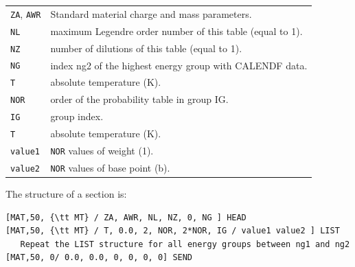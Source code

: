 \begin{tabular}{l l}
{\tt ZA}, {\tt AWR} & Standard material charge and mass parameters. \\
{\tt NL} & maximum Legendre order number of this table (equal to 1). \\
{\tt NZ} & number of dilutions of this table (equal to 1). \\
{\tt NG} & index ng2 of the highest energy group with CALENDF data. \\
{\tt T} & absolute temperature (K). \\
{\tt NOR} & order of the probability table in group IG. \\
{\tt IG} & group index. \\
{\tt T} & absolute temperature (K). \\
{\tt value1} & {\tt NOR} values of weight (1). \\
{\tt value2} & {\tt NOR} values of base point (b). \\
\end{tabular}

\vskip 0.2cm

The structure of a section is:
\small
\begin{verbatim}
[MAT,50, {\tt MT} / ZA, AWR, NL, NZ, 0, NG ] HEAD
[MAT,50, {\tt MT} / T, 0.0, 2, NOR, 2*NOR, IG / value1 value2 ] LIST
   Repeat the LIST structure for all energy groups between ng1 and ng2
[MAT,50, 0/ 0.0, 0.0, 0, 0, 0, 0] SEND
\end{verbatim}
\normalsize
\normalsize

\cleardoublepage
